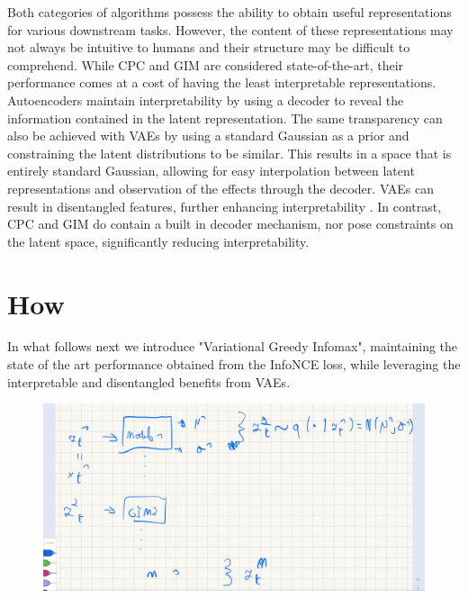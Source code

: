 		Both categories of algorithms possess the ability to obtain useful representations for various downstream tasks. However, the content of these representations may not always be intuitive to humans and their structure may be difficult to comprehend. While CPC and GIM are considered state-of-the-art, their performance comes at a cost of having the least interpretable representations. Autoencoders maintain interpretability by using a decoder to reveal the information contained in the latent representation. The same transparency can also be achieved with VAEs by using a standard Gaussian as a prior and constraining the latent distributions to be similar. This results in a space that is entirely standard Gaussian, allowing for easy interpolation between latent representations and observation of the effects through the decoder. VAEs can result in disentangled features, further enhancing interpretability \cite{grossuttiDeepLearningInfrared2022}. In contrast, CPC and GIM do contain a built in decoder mechanism, nor pose constraints on the latent space, significantly reducing interpretability.
		


\section{How}
		In what follows next we introduce "Variational Greedy Infomax", maintaining the state of the art performance obtained from the InfoNCE loss, while leveraging the interpretable and disentangled benefits from VAEs.
		


	\begin{figure}
	\centering
	\includegraphics[width=0.7\linewidth]{temp_variational_gim}
	\caption{}
	\label{fig:tempvariationalgim}
\end{figure}

